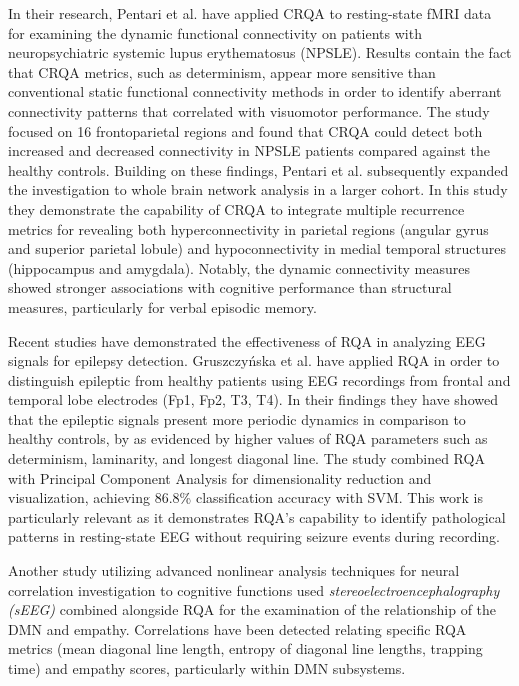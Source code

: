 \documentclass{article}
\begin{document}
			In their research, Pentari et al.\cite{pentari22} have applied CRQA to resting-state fMRI data 
			for examining the dynamic functional connectivity on patients with neuropsychiatric systemic 
			lupus erythematosus (NPSLE). Results contain the fact that CRQA metrics, such as determinism,
			appear more sensitive than conventional static functional connectivity methods in order to
			identify aberrant connectivity patterns that correlated with visuomotor performance. 
			The study focused on 16 frontoparietal regions and found that CRQA could detect 
			both increased and decreased connectivity in NPSLE patients compared against the healthy controls. 
			Building on these findings, Pentari et al.\cite{pentari23} subsequently expanded 
			the investigation to whole brain network analysis in a larger cohort. 
			In this study they demonstrate the capability of CRQA to integrate multiple recurrence metrics 
			for revealing both hyperconnectivity in parietal regions (angular gyrus and superior parietal lobule) 
			and hypoconnectivity in medial temporal structures (hippocampus and amygdala). 
			Notably, the dynamic connectivity measures showed stronger associations with cognitive 
			performance than structural measures, particularly for verbal episodic memory. 

			Recent studies have demonstrated the effectiveness of RQA in 
			analyzing EEG signals for epilepsy detection. 
			Gruszczyńska et al.\cite{gruszczynska2019} have applied RQA
			in order to distinguish epileptic from healthy patients using EEG recordings 
			from frontal and temporal lobe electrodes (Fp1, Fp2, T3, T4). 
			In their findings they have showed that the epileptic signals present more periodic
			dynamics in comparison to healthy controls, by as evidenced by higher values of 
			RQA parameters such as determinism,
			laminarity, and longest diagonal line. The study combined RQA with
			Principal Component Analysis for dimensionality reduction and visualization, achieving 86.8\% 
			classification accuracy with SVM. This work is particularly relevant as it demonstrates RQA's capability
			to identify pathological patterns in resting-state EEG without requiring seizure events during recording.

			Another study utilizing advanced nonlinear analysis techniques for neural correlation investigation to
			cognitive functions \cite{mo} used \textit{stereoelectroencephalography (sEEG)} combined alongside RQA 
			for the examination of the relationship of the DMN and empathy. 
			Correlations have been detected relating specific RQA metrics 
			(mean diagonal line length, entropy of diagonal line lengths, trapping time) 
			and empathy scores, particularly within DMN subsystems. 
\end{document}
